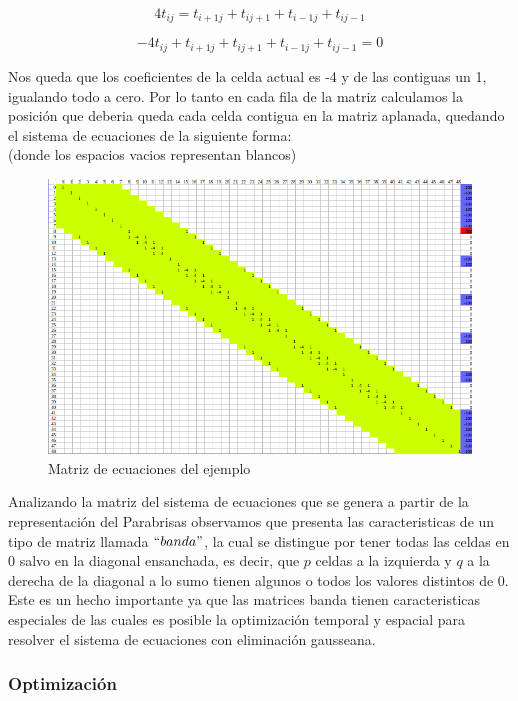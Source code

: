 \[
4 t_{ij} = t_{i+1 j} + t_{i j+1} + t_{i-1 j} + t_{i j-1}
\]

\[
 - 4 t_{ij} + t_{i+1 j} + t_{i j+1} + t_{i-1 j} + t_{i j-1}  = 0
\]

Nos queda que los coeficientes de la celda actual es -4 y de las contiguas un 1, igualando todo a cero.
Por lo tanto en cada fila de la matriz calculamos la posición que deberia queda cada celda contigua en la matriz aplanada, quedando el sistema de ecuaciones de la siguiente forma: \\
(donde los espacios vacios representan blancos)
\begin{figure}
\begin{center}
\includegraphics[scale=0.60]{imagenes/matrizej.png} 
\caption{Matriz de ecuaciones del ejemplo} 
\end{center}
\end{figure}


\newpage

Analizando la matriz del sistema de ecuaciones que se genera a partir de la representación del Parabrisas observamos que presenta las caracteristicas de un tipo de matriz llamada $``banda"$, la cual se distingue por tener todas las celdas en 0 salvo en la diagonal ensanchada, es decir, que $p$ celdas a la izquierda y $q$ a la derecha de la diagonal a lo sumo tienen algunos o todos los valores distintos de 0. 
Este es un hecho importante ya que las matrices banda tienen caracteristicas especiales de las cuales es posible la optimización temporal y espacial para resolver el sistema de ecuaciones con eliminación gausseana.

\subsubsection{Optimización}

